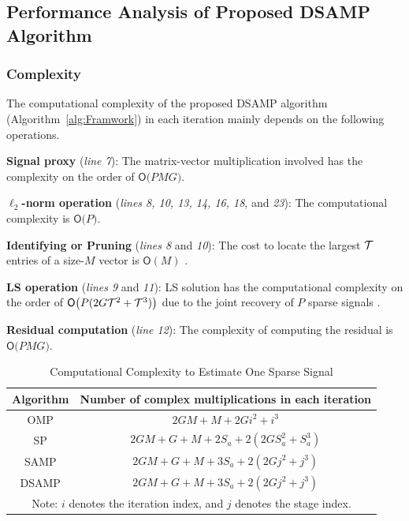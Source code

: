 \documentclass[final]{IEEEtran}
\begin{document}
\subsection{Performance Analysis of Proposed DSAMP Algorithm}\label{S4.4}

\subsubsection{Complexity}

 The computational complexity of the proposed DSAMP algorithm (Algorithm~\ref{alg:Framwork})
 in each iteration mainly depends on the following operations.

 {\bf Signal proxy} (\emph{line 7}):  The matrix-vector multiplication involved has the
 complexity on the order of $\textsf{O}\big(P M G\big)$.

 {\bf $\ell_{2}$-norm operation} (\emph{lines 8, 10, 13, 14, 16, 18}, and \emph{23}): The
 computational complexity is $\textsf{O}\big(P\big)$.

 {\bf Identifying or Pruning} (\emph{lines 8} and \emph{10}): The cost to locate the
 largest $\cal{T}$ entries of a size-$M$ vector is $\textsf{O}(M)$ \cite{STR_CS}.

 {\bf LS operation} (\emph{lines 9} and \emph{11}): LS solution has the computational
 complexity on the order of $\textsf{O}\big(P(2G{\cal T}^2+{\cal T}^3)\big)$ due to
 the joint recovery of $P$ sparse signals \cite{LS}.

 {\bf Residual computation} (\emph{line 12}): The complexity of computing the residual is
 $\textsf{O}\big(P M G\big)$.

\begin{table}[tp!]
\caption{Computational Complexity to Estimate One Sparse Signal}
\label{TAB1}
\begin{center}
\begin{tabular}{c |c }
\hline
\hline
 {Algorithm} & \multicolumn{1}{c}{Number of complex multiplications in each iteration} \\
 \hline
 OMP   & $2GM + M + 2G{i^2} + {i^3}$ \\ %
 SP    & $2GM + G+M + 2{S_a} + 2(2GS_a^2 + S_a^3)$ \\
 SAMP  & $2GM + {{G}} + M + 3{S_a} + 2(2G{j^2} + {j^3})$ \\%
 DSAMP & $2GM + {{G}} + M + 3{S_a} + 2(2G{j^2} + {j^3})$ \\
\hline
\hline
\multicolumn{2}{c}{Note: $i$ denotes the iteration index, and $j$ denotes the stage index.}
\end{tabular}
\end{center}
\end{table}
\end{document}
